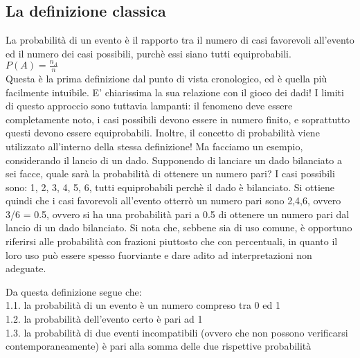 \documentclass[a4paper]{article}
\begin{document}
\subsection{La definizione classica}
La probabilit\`{a} di un evento \`{e} il rapporto tra il numero di casi favorevoli all'evento ed il numero dei casi possibili, purch\`{e} essi siano tutti equiprobabili.
\\
\begin{math}
 P(A)=\frac{n_A}{n}
\end{math}
\\
Questa \`{e} la prima definizione dal punto di vista cronologico, ed \`{e} quella più facilmente intuibile. E' chiarissima la sua relazione con il gioco dei dadi!
I limiti di questo approccio sono tuttavia lampanti: il fenomeno deve essere completamente noto, i casi possibili devono essere in numero finito, e soprattutto questi devono essere equiprobabili. Inoltre, il concetto di probabilit\`{a} viene utilizzato all'interno della stessa definizione!
Ma facciamo un esempio, considerando il lancio di un dado.
Supponendo di lanciare un dado bilanciato a sei facce, quale sar\`{a} la probabilit\`{a} di ottenere un numero pari?
I casi possibili sono: {1, 2, 3, 4, 5, 6}, tutti equiprobabili perch\`{e} il dado \`{e} bilanciato.
Si ottiene quindi che i casi favorevoli all'evento {otterrò un numero pari} sono {2,4,6}, ovvero 3/6 = 0.5, ovvero si ha una probabilit\`{a} pari a 0.5 di ottenere un numero pari dal lancio di un dado bilanciato.
Si nota che, sebbene sia di uso comune, \`{e} opportuno riferirsi alle probabilit\`{a} con frazioni piuttosto che con percentuali, in quanto il loro uso può essere spesso fuorviante e dare adito ad interpretazioni non adeguate.

Da questa definizione segue che:\\
1.1. la probabilit\`{a} di un evento \`{e} un numero compreso tra 0 ed 1\\
1.2. la probabilit\`{a} dell'evento certo \`{e} pari ad 1\\
1.3. la probabilit\`{a} di due eventi incompatibili (ovvero che non possono verificarsi contemporaneamente) \`{e} pari alla somma delle due rispettive probabilit\`{a}\\
\end{document}
